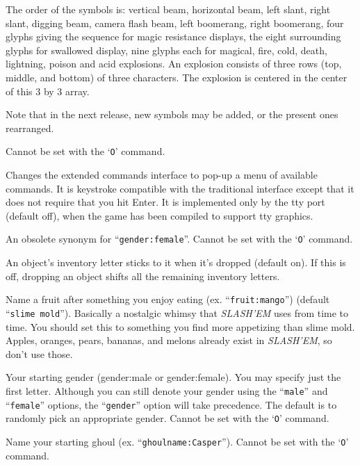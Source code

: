 The order of the symbols is:  vertical beam, horizontal beam, left slant,
right slant, digging beam, camera flash beam, left boomerang, right boomerang,
four glyphs giving the sequence for magic resistance displays,
the eight surrounding glyphs for swallowed display,
nine glyphs each for magical, fire, cold, death, lightning, poison and acid explosions.
An explosion consists of three rows (top, middle, and bottom) of three
characters.  The explosion is centered in the center of this 3 by 3
array.

Note that in the next release, new symbols may be added,
or the present ones rearranged.

Cannot be set with the `{\tt O}' command.

\item[\ib{extmenu}]
Changes the extended commands interface to pop-up a menu of available commands.  
It is keystroke compatible with the traditional interface except that it does
not require that you hit Enter. It is implemented only by the tty port 
(default off), when the game has been compiled to support tty graphics.

\item[\ib{female}]
An obsolete synonym for ``{\tt gender:female}''.
Cannot be set with the `{\tt O}' command.

\item[\ib{fixinv}]
An object's inventory letter sticks to it when it's dropped (default on).
If this is off, dropping an object shifts all the remaining inventory letters.

\item[\ib{fruit}]
Name a fruit after something you enjoy eating (ex. ``{\tt fruit:mango}'')
(default ``{\tt slime mold}'').  Basically a nostalgic whimsy that {\it SLASH'EM\/} uses
from time to time.  You should set this to something you find more
appetizing than slime mold.  Apples, oranges, pears, bananas, and melons
already exist in {\it SLASH'EM}, so don't use those.

\item[\ib{gender}]
Your starting gender (gender:male or gender:female).
You may specify just the first letter.  Although you can
still denote your gender using the ``{\tt male}'' and ``{\tt female}''
options, the ``{\tt gender}'' option will take precedence.
The default is to randomly pick an appropriate gender.
Cannot be set with the `{\tt O}' command.

\item[\ib{ghoulname}]
Name your starting ghoul (ex. ``{\tt ghoulname:Casper}'').
Cannot be set with the `{\tt O}' command.

